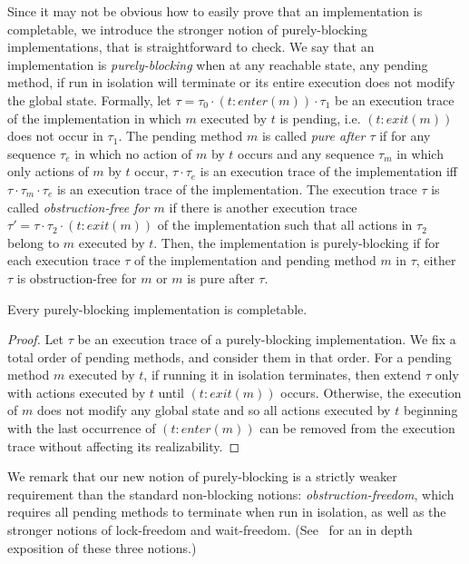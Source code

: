 \documentclass{LMCS}
\begin{document}
Since it may not be obvious how to easily prove that an implementation is
completable, we introduce the stronger notion of purely-blocking
implementations, that is straightforward to check.
We say that an implementation is \emph{purely-blocking} when at any reachable state,
any pending method, if run in isolation will terminate or its entire execution does
not modify the global state.
Formally, let $\tau=\tau_0\cdot (t:enter(m))\cdot \tau_1$ be an execution trace of the implementation in which $m$ executed by $t$ is pending, i.e. $(t:exit(m))$ does not occur in $\tau_1$.
The pending method $m$ is called {\em pure after $\tau$} if for any sequence $\tau_e$ in which no action of $m$ by $t$ occurs and any sequence $\tau_m$ in which only actions of $m$ by $t$ occur, $\tau\cdot \tau_e$ is an execution trace of the implementation iff $\tau\cdot \tau_m\cdot \tau_e$ is an execution trace of the implementation.
The execution trace $\tau$ is called {\em obstruction-free for $m$} if there is another execution trace $\tau'=\tau\cdot \tau_2\cdot (t:exit(m))$ of the implementation such that all actions in $\tau_2$ belong to $m$ executed by $t$.
Then, the implementation is purely-blocking if for each execution trace $\tau$ of the implementation and pending method $m$ in $\tau$, either $\tau$ is obstruction-free for $m$ or $m$ is pure after $\tau$.

\begin{prop}\label{prop:pb}
Every purely-blocking implementation is completable.
\end{prop}

\begin{proof}
Let $\tau$ be an execution trace of a purely-blocking implementation.
We fix a total order of pending methods, and consider them in that order. 
For a pending method $m$ executed by $t$, if running it in isolation terminates, then extend $\tau$ only with actions executed by $t$ until $(t:exit(m))$ occurs.
Otherwise, the execution of $m$ does not modify any global state and so all actions executed by $t$ beginning with the last occurrence of $(t:enter(m))$ can be removed from the execution trace without affecting its realizability.
\end{proof}

We remark that our new notion of purely-blocking is a strictly weaker
requirement than the standard non-blocking notions:
\emph{obstruction-freedom}, which requires all pending methods to terminate when run in isolation, 
as well as the stronger notions of lock-freedom and wait-freedom.
(See~\cite{HS2008} for an in depth exposition of these three notions.)
\end{document}

